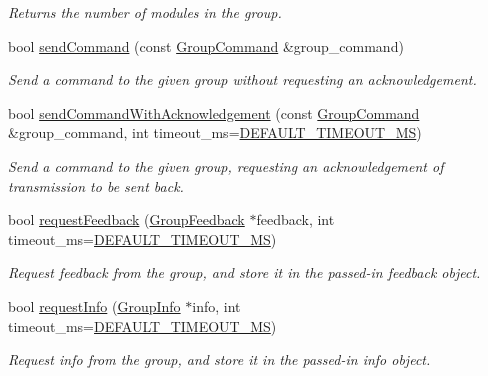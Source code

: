 \begin{DoxyCompactItemize}
\begin{DoxyCompactList}\small\item\em Returns the number of modules in the group. \end{DoxyCompactList}\item 
bool \hyperlink{classhebi_1_1Group_a3645f8c1019e6949dc64fbdec7f73442}{send\+Command} (const \hyperlink{classhebi_1_1GroupCommand}{Group\+Command} \&group\+\_\+command)
\begin{DoxyCompactList}\small\item\em Send a command to the given group without requesting an acknowledgement. \end{DoxyCompactList}\item 
bool \hyperlink{classhebi_1_1Group_a992aad2873e2d108c2d4deb3f824a538}{send\+Command\+With\+Acknowledgement} (const \hyperlink{classhebi_1_1GroupCommand}{Group\+Command} \&group\+\_\+command, int timeout\+\_\+ms=\hyperlink{classhebi_1_1Group_a3d01ca6dbd28ec984cda196a77056dd4}{D\+E\+F\+A\+U\+L\+T\+\_\+\+T\+I\+M\+E\+O\+U\+T\+\_\+\+MS})
\begin{DoxyCompactList}\small\item\em Send a command to the given group, requesting an acknowledgement of transmission to be sent back. \end{DoxyCompactList}\item 
bool \hyperlink{classhebi_1_1Group_a191170df8c2b64e039063e89449b4587}{request\+Feedback} (\hyperlink{classhebi_1_1GroupFeedback}{Group\+Feedback} $\ast$feedback, int timeout\+\_\+ms=\hyperlink{classhebi_1_1Group_a3d01ca6dbd28ec984cda196a77056dd4}{D\+E\+F\+A\+U\+L\+T\+\_\+\+T\+I\+M\+E\+O\+U\+T\+\_\+\+MS})
\begin{DoxyCompactList}\small\item\em Request feedback from the group, and store it in the passed-\/in feedback object. \end{DoxyCompactList}\item 
bool \hyperlink{classhebi_1_1Group_a1065ad12a649d135758c1b6a95df650e}{request\+Info} (\hyperlink{classhebi_1_1GroupInfo}{Group\+Info} $\ast$info, int timeout\+\_\+ms=\hyperlink{classhebi_1_1Group_a3d01ca6dbd28ec984cda196a77056dd4}{D\+E\+F\+A\+U\+L\+T\+\_\+\+T\+I\+M\+E\+O\+U\+T\+\_\+\+MS})
\begin{DoxyCompactList}\small\item\em Request info from the group, and store it in the passed-\/in info object. \end{DoxyCompactList}\item 

\end{DoxyCompactItemize}

